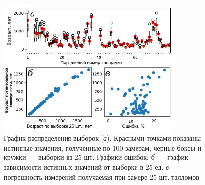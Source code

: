 \begin{figure}[H]
  \begin{center}
    \includegraphics[width=0.8\textwidth]{authors/kolegov-fig2.jpg}
  \end{center}
  \caption{График распределения выборок (\textit{а}). Красными точками показаны истинные значения,
полученные по 100 замерам, черные боксы и кружки~--- выборки из 25 шт. Графики ошибок: \textit{б}~--- график зависимости истинных значений от выборки в 25 ед. \textit{в}~--- погрешность измерений получаемая при замере 25 шт. талломов}
  \label{fig:kolegov}
\end{figure}
